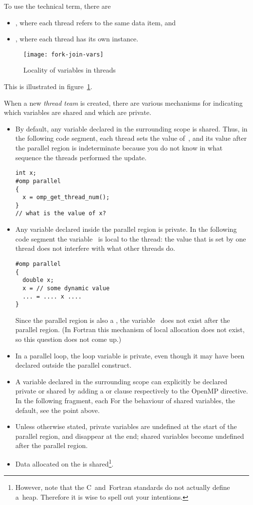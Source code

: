 To use the technical term, there are
\begin{itemize}
\item {},
  where each thread refers to the same data item, and 
\item {},
  where each thread has its own instance.
\end{itemize}
%
\begin{figure}[ht]
\texttt{[image: fork-join-vars]}
\caption{Locality of variables in threads}
\label{fig:threadvars}
\end{figure}
%
This is illustrated in figure~\ref{fig:threadvars}.

When a new \emph{thread team} is created,
there are various mechanisms for indicating which variables are shared
and which are private.
\begin{itemize}
\item By default, any variable declared in the surrounding scope is
  shared. Thus, in the following code segment, each thread sets the
  value of~, and its value after the parallel region is
  indeterminate because you do not know in what sequence the threads
  performed the update.
\begin{verbatim}
int x;
#omp parallel
{
  x = omp_get_thread_num();
}
// what is the value of x?
\end{verbatim}
\item Any variable declared inside the parallel region is private. In
  the following code segment the variable~ is local to the
  thread: the value that is set by one thread does not interfere with
  what other threads do.
\begin{verbatim}
#omp parallel
{
  double x;
  x = // some dynamic value
  ... = .... x ....
}
\end{verbatim}
  Since the parallel region is also a , the
  variable~ does not exist after the parallel region. (In Fortran
  this mechanism of local allocation does not exist, so this question
  does not come up.)
\item In a parallel loop, the loop variable is private, even though it may
  have been declared outside the parallel construct.
\item A variable declared in the surrounding scope can explicitly be
  declared private or shared by adding a 
  or  clause respectively to the OpenMP
  directive. In the following fragment, each 
  For the behaviour of shared variables, the default, see the point above.
\item Unless otherwise stated, private variables are undefined at the
  start of the parallel region, and disappear at the end; shared
  variables become undefined after the parallel region.
\item Data allocated on the  is
  shared\footnote{However, note that the C~and~Fortran standards do
    not actually define a~heap. Therefore it is wise to spell out your
    intentions.}.
\end{itemize}

